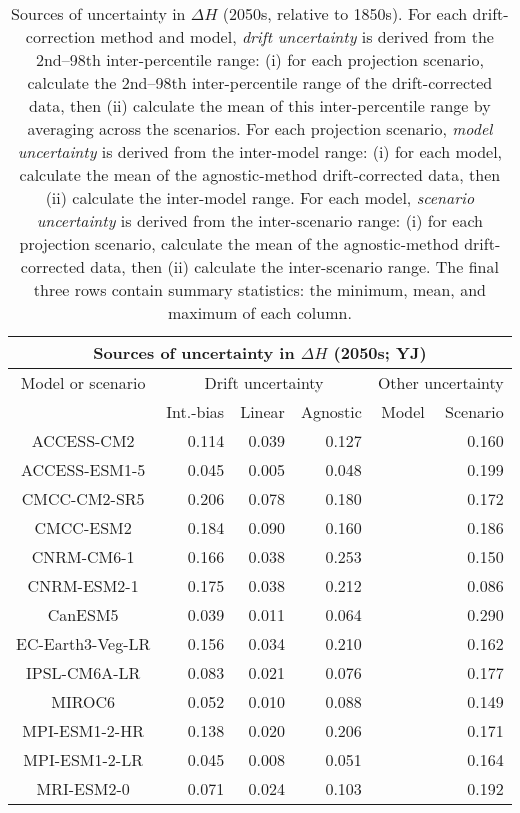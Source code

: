 \begin{table*}[t]
\centering
\caption{Sources of uncertainty in $\Delta H$ (2050s, relative to 1850s). For each drift-correction method and model, \emph{drift uncertainty} is derived from the 2nd--98th inter-percentile range: (i) for each projection scenario, calculate the 2nd--98th inter-percentile range of the drift-corrected data, then (ii) calculate the mean of this inter-percentile range by averaging across the scenarios. For each projection scenario, \emph{model uncertainty} is derived from the inter-model range: (i) for each model, calculate the mean of the agnostic-method drift-corrected data, then (ii) calculate the inter-model range. For each model, \emph{scenario uncertainty} is derived from the inter-scenario range: (i) for each projection scenario, calculate the mean of the agnostic-method drift-corrected data, then (ii) calculate the inter-scenario range. The final three rows contain summary statistics: the minimum, mean, and maximum of each column.}
\begin{tabular}{c|rrr|rr}
\toprule
\multicolumn{6}{c}{Sources of uncertainty in $\Delta H$ (2050s; YJ)} \\ 
\midrule
Model or scenario & \multicolumn{3}{c|}{Drift uncertainty} & \multicolumn{2}{c}{Other uncertainty} \\
 & Int.-bias & Linear & Agnostic & Model & Scenario \\
\midrule
ACCESS-CM2 & 0.114 & 0.039 & 0.127 &  & 0.160 \\
ACCESS-ESM1-5 & 0.045 & 0.005 & 0.048 &  & 0.199 \\
CMCC-CM2-SR5 & 0.206 & 0.078 & 0.180 &  & 0.172 \\
CMCC-ESM2 & 0.184 & 0.090 & 0.160 &  & 0.186 \\
CNRM-CM6-1 & 0.166 & 0.038 & 0.253 &  & 0.150 \\
CNRM-ESM2-1 & 0.175 & 0.038 & 0.212 &  & 0.086 \\
CanESM5 & 0.039 & 0.011 & 0.064 &  & 0.290 \\
EC-Earth3-Veg-LR & 0.156 & 0.034 & 0.210 &  & 0.162 \\
IPSL-CM6A-LR & 0.083 & 0.021 & 0.076 &  & 0.177 \\
MIROC6 & 0.052 & 0.010 & 0.088 &  & 0.149 \\
MPI-ESM1-2-HR & 0.138 & 0.020 & 0.206 &  & 0.171 \\
MPI-ESM1-2-LR & 0.045 & 0.008 & 0.051 &  & 0.164 \\
MRI-ESM2-0 & 0.071 & 0.024 & 0.103 &  & 0.192 \\

\end{tabular}
\end{table*}
